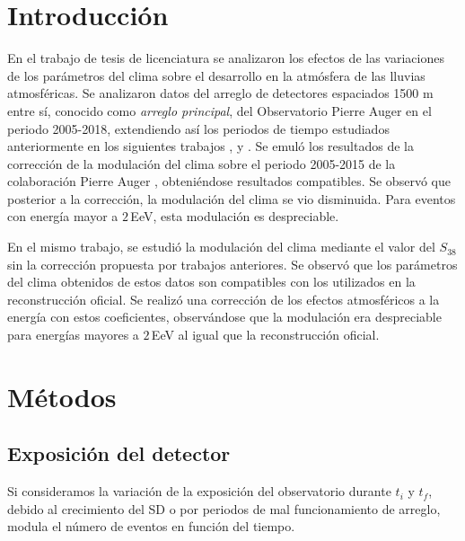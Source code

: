 
	\section{Introducción}

En el trabajo de tesis de licenciatura se analizaron los efectos de las variaciones de los parámetros del clima sobre el desarrollo en la atmósfera de las lluvias atmosféricas. Se analizaron datos del arreglo de detectores espaciados 1500 m entre sí, conocido como \emph{arreglo principal}, del Observatorio Pierre Auger en el periodo 2005-2018,  extendiendo  así los periodos de tiempo estudiados anteriormente en los siguientes trabajos \cite{abraham2009atmospheric}, \cite{abreu2012description}   y \cite{aab2017impact} . Se emuló los resultados de la corrección de la modulación del clima sobre el periodo 2005-2015 de la colaboración Pierre Auger \cite{aab2017impact}, obteniéndose resultados compatibles. Se observó que posterior a la corrección, la modulación del clima se vio disminuida. Para eventos con energía mayor a $2\,$EeV, esta modulación es despreciable.

En el mismo trabajo, se estudió la modulación del clima mediante el valor del $S_{38}$ sin la corrección propuesta por trabajos anteriores. Se observó que los parámetros del clima obtenidos de estos datos son compatibles con los utilizados en la reconstrucción oficial. Se realizó una corrección de los efectos atmosféricos a la energía con estos coeficientes, observándose que la modulación era despreciable para energías mayores a $2\,$EeV al igual que la reconstrucción oficial. 


	\section{Métodos}

	\subsection{Exposición del detector}

	Si consideramos la variación de la exposición del observatorio durante $t_{i}$ y $t_f$, debido al crecimiento del SD o por periodos de mal funcionamiento de arreglo, modula el número de 	eventos en función del tiempo. 
	
